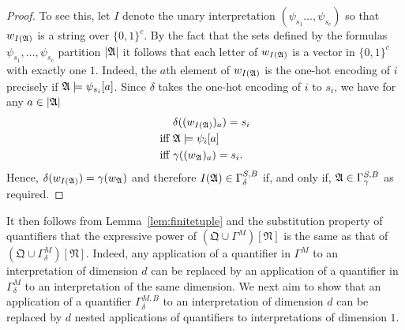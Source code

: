 \documentclass[a4paper,UKenglish,cleveref, autoref, thm-restate, anonymous]{lipics-v2021}
\begin{document}
\begin{proof}
          To see this, let $I$ denote the unary interpretation $(\psi_{s_1}\ldots,\psi_{s_c})$ so that $w_{I(\mathfrak{A})}$ is a string over $\{0,1\}^c$.  By the fact that the sets defined by the formulas $\psi_{s_1},\ldots,\psi_{s_c}$ partition $|\mathfrak{A}|$ it follows that each letter of $w_{I(\mathfrak{A})}$ is a vector in $\{0,1\}^c$ with exactly one $1$.  Indeed, the $a$th element of $w_{I(\mathfrak{A})}$ is the one-hot encoding of $i$ precisely if $\mathfrak{A} \models \psi_{s_i}[a]$.  Since $\delta$ takes the one-hot encoding of $i$ to $s_i$, we have for any $a \in |\mathfrak{A}|$
          \begin{align*}
            & \delta((w_{I(\mathfrak{A})})_a)  =  s_i \\
            \text{iff}\ & \mathfrak{A} \models\psi_i[a] \\
            \text{iff}\ & \gamma((w_{\mathfrak{A}})_a) = s_i.
          \end{align*}
            Hence, $\delta(w_{I(\mathfrak{A})}) = \gamma(w_{\mathfrak{A}})$ and therefore $I(\mathfrak{A}) \in \Gamma^{S,B}_{\delta}$ if, and only if, $\mathfrak{A} \in \Gamma^{S,B}_{\gamma}$ as required.
        
  \end{proof}

  It then follows from Lemma~\ref{lem:finitetuple} and the substitution property of quantifiers that the expressive power of $(\mathfrak{Q} \cup \Gamma^{M})[\mathfrak{N}]$ is the same as that of $(\mathfrak{Q} \cup \Gamma^{M}_{\delta})[\mathfrak{N}]$.  Indeed, any application of a quantifier in $\Gamma^M$ to an interpretation of dimension $d$ can be replaced by an application of a quantifier in $\Gamma^{M}_{\delta}$ to an interpretation of the same dimension.  We next aim to show that an application of a quantifier $\Gamma^{M,B}_{\delta}$ to an interpretation of dimension $d$ can be replaced by $d$ nested applications of quantifiers to interpretations of dimension $1$.
\end{document}
